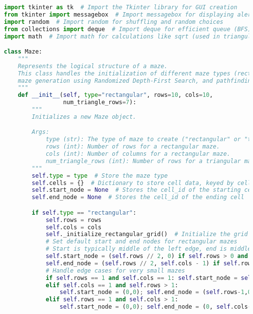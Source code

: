 \documentclass[UTF8]{report}
\theoremstyle{MyLineTheoremStyle} %
\theoremstyle{MyBlockTheoremStyle} %
\theoremstyle{MySubsubsectionStyle} %
\begin{document}
\begin{lstlisting}[language=Python, caption={迷宫生成与求解程序代码}]
import tkinter as tk  # Import the Tkinter library for GUI creation
from tkinter import messagebox  # Import messagebox for displaying alerts
import random  # Import random for shuffling and random choices
from collections import deque  # Import deque for efficient queue (BFS) and stack (DFS) operations
import math  # Import math for calculations like sqrt (used in triangular maze geometry)

class Maze:
    """
    Represents the logical structure of a maze.
    This class handles the initialization of different maze types (rectangular, triangular),
    maze generation using Randomized Depth-First Search, and pathfinding algorithms (BFS, DFS).
    """
    def __init__(self, type="rectangular", rows=10, cols=10, 
                 num_triangle_rows=7): 
        """
        Initializes a new Maze object.

        Args:
            type (str): The type of maze to create ("rectangular" or "triangular").
            rows (int): Number of rows for a rectangular maze.
            cols (int): Number of columns for a rectangular maze.
            num_triangle_rows (int): Number of rows for a triangular maze.
        """
        self.type = type  # Store the maze type
        self.cells = {}  # Dictionary to store cell data, keyed by cell_id (e.g., (row, col))
        self.start_node = None  # Stores the cell_id of the starting cell
        self.end_node = None  # Stores the cell_id of the ending cell

        if self.type == "rectangular":
            self.rows = rows
            self.cols = cols
            self._initialize_rectangular_grid()  # Initialize the grid structure for a rectangular maze
            # Set default start and end nodes for rectangular mazes
            # Start is typically middle of the left edge, end is middle of the right edge
            self.start_node = (self.rows // 2, 0) if self.rows > 0 and self.cols > 0 else (0,0)
            self.end_node = (self.rows // 2, self.cols - 1) if self.rows > 0 and self.cols > 0 else (0,0)
            # Handle edge cases for very small mazes
            if self.rows == 1 and self.cols == 1: self.start_node = self.end_node = (0,0)
            elif self.cols == 1 and self.rows > 1: 
                self.start_node = (0,0); self.end_node = (self.rows-1,0)
            elif self.rows == 1 and self.cols > 1: 
                self.start_node = (0,0); self.end_node = (0, self.cols-1)



\end{lstlisting}
\end{document}
